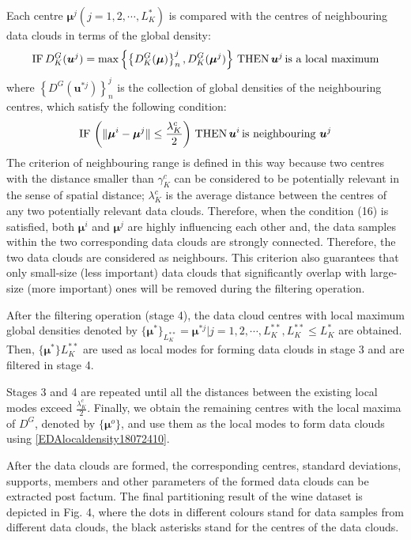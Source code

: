 {Each centre $\bm\mu^j( j = 1, 2, \cdots, L_K^*)$ is compared with the centres of neighbouring data clouds in terms of the global density:
\begin{align}\label{EDAlocaldensity18072416}
\textup{IF}\,  D^G_K(\bm u^{j})=\max \left\{ \left\{D^G_K(\bm \mu)\right\}_n^j,D^G_K(\bm \mu^j)\right\}\, \textup{THEN}\, \bm u^{j}\,\textup{is a local maximum}
\end{align}
where $\left\{ D^G(\bm u^{*j}) \right\}_n^j$ is the collection of global densities of the neighbouring centres, which satisfy the following condition:
\begin{align}\label{EDAlocaldensity18072417}
\textup{IF}\,  \left(\|\bm \mu^i-\bm \mu^j\|\leq \frac{\lambda_K^c}{2}\right)\, \textup{THEN}\, \bm u^{i}\,\textup{is neighbouring }\bm u^{j}
\end{align}
The criterion of neighbouring range is defined in this way because two centres with the distance smaller than $\gamma_K^c$ can be considered to be potentially relevant in the sense of spatial distance; $\lambda_K^c$ is the average distance between the centres of any two potentially relevant data clouds. Therefore, when the condition (16) is satisfied, both $\bm \mu^i$ and $\bm \mu^j$ are highly influencing each other and, the data samples within the two corresponding data clouds are strongly connected. Therefore, the two data clouds are considered as neighbours. This criterion also guarantees that only small-size (less important) data clouds that
significantly overlap with large-size (more important) ones will be removed during the filtering operation.

After the filtering operation (stage 4), the data cloud centres with local maximum global densities denoted by
$\{\bm \mu^{*}\}_{L_K^{**}}={\bm \mu^{*j}| j = 1, 2, \cdots, L_K^{**} , L_K^{**} \leq L_K^{*}}$ are obtained. Then, $\{\bm \mu^*\}L_K^{**}$ are used as local modes for forming data clouds in stage 3 and are filtered in stage 4.

Stages 3 and 4 are repeated until all the distances between the existing local modes exceed $\frac{\lambda_K^c} 2$. Finally, we obtain the remaining centres with the local maxima of $D^G$, denoted by $\{\bm\mu^o\}$, and use them as the local modes to form data clouds
using \eqref{EDAlocaldensity18072410}.

After the data clouds are formed, the corresponding centres, standard deviations, supports, members and other parameters of the formed data clouds can be extracted post factum. The final partitioning result of the wine dataset \cite{AeberhardWinedata1992} is depicted in Fig. 4, where the dots in different colours stand for data samples from different data clouds, the black asterisks stand for
the centres of the data clouds.

}
